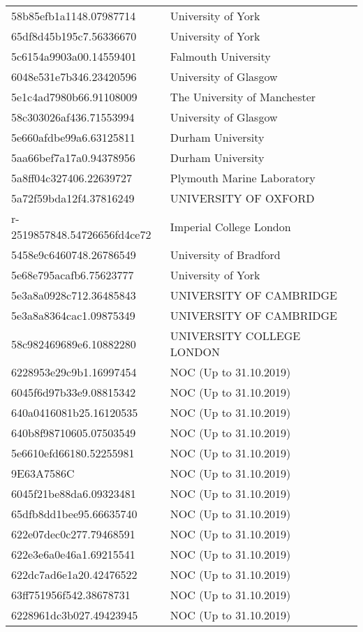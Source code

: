\begin{tabular}{ll}
58b85efb1a1148.07987714 & University of York \\
65df8d45b195c7.56336670 & University of York \\
5c6154a9903a00.14559401 & Falmouth University \\
6048e531e7b346.23420596 & University of Glasgow \\
5e1c4ad7980b66.91108009 & The University of Manchester \\
58c303026af436.71553994 & University of Glasgow \\
5e660afdbe99a6.63125811 & Durham University \\
5aa66bef7a17a0.94378956 & Durham University \\
5a8ff04c327406.22639727 & Plymouth Marine Laboratory \\
5a72f59bda12f4.37816249 & UNIVERSITY OF OXFORD \\
r-2519857848.54726656fd4ce72 & Imperial College London \\
5458e9c6460748.26786549 & University of Bradford \\
5e68e795acafb6.75623777 & University of York \\
5e3a8a0928c712.36485843 & UNIVERSITY OF CAMBRIDGE \\
5e3a8a8364cac1.09875349 & UNIVERSITY OF CAMBRIDGE \\
58c982469689e6.10882280 & UNIVERSITY COLLEGE LONDON \\
6228953e29c9b1.16997454 & NOC (Up to 31.10.2019) \\
6045f6d97b33e9.08815342 & NOC (Up to 31.10.2019) \\
640a0416081b25.16120535 & NOC (Up to 31.10.2019) \\
640b8f98710605.07503549 & NOC (Up to 31.10.2019) \\
5e6610efd66180.52255981 & NOC (Up to 31.10.2019) \\
9E63A7586C & NOC (Up to 31.10.2019) \\
6045f21be88da6.09323481 & NOC (Up to 31.10.2019) \\
65dfb8dd1bee95.66635740 & NOC (Up to 31.10.2019) \\
622e07dec0c277.79468591 & NOC (Up to 31.10.2019) \\
622e3e6a0e46a1.69215541 & NOC (Up to 31.10.2019) \\
622dc7ad6e1a20.42476522 & NOC (Up to 31.10.2019) \\
63ff751956f542.38678731 & NOC (Up to 31.10.2019) \\
6228961dc3b027.49423945 & NOC (Up to 31.10.2019) \\

\end{tabular}
